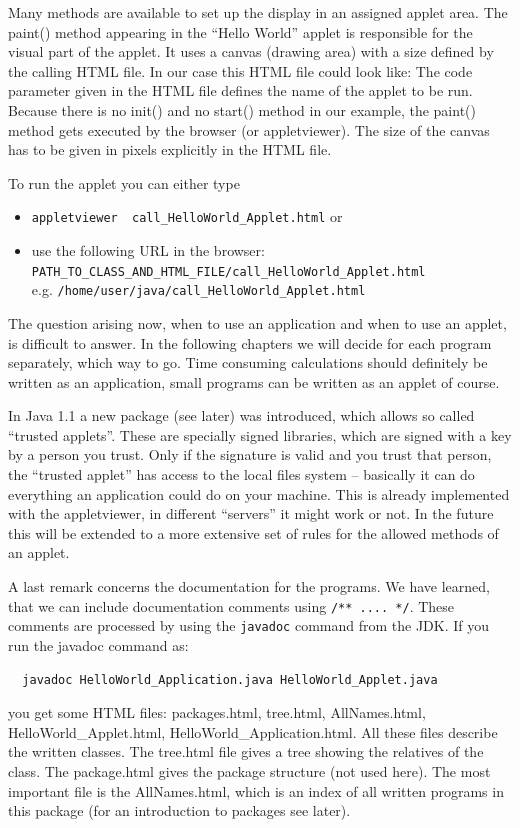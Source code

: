 Many methods are available to set up the display in an assigned applet area.
The paint() method appearing in the ``Hello World'' applet is
responsible for the visual part of the applet. It uses a canvas
(drawing area) with a size defined by the calling HTML file. In our case
this HTML file could look like:
The code parameter given in the HTML file defines the name of the applet
to be run. Because there is no init() and no start() method in our
example, the paint() method gets executed by the browser (or appletviewer).
The size of the canvas has to be given in pixels explicitly in the
HTML file.

To run the applet you can either type
\begin{itemize}
\item \verb|appletviewer  call_HelloWorld_Applet.html| or
\item use the following URL in the browser: \\
        \verb|PATH_TO_CLASS_AND_HTML_FILE/call_HelloWorld_Applet.html| \\
        e.g. \verb|/home/user/java/call_HelloWorld_Applet.html|
\end{itemize}

The question arising now, when to use an application and when to use
an applet, is difficult to answer. In the following chapters we will 
decide for each program
separately, which way to go. Time consuming calculations should
definitely be written as an application, small programs can be
written as an applet of course.

In Java 1.1 a new package (see later) was introduced, which allows
so called ``trusted applets''. These are specially signed libraries,
which are signed with a key by a person you trust. Only if the
signature is valid and you trust that person, the ``trusted applet''
has access to the local files system -- basically it can do everything
an application could do on your machine. This is already implemented with
the appletviewer, in different ``servers'' it might work or not. In the
future this will be extended to a more extensive set of rules for the
allowed methods of an applet.

A last remark concerns the documentation for the programs. We have
learned, that we can include documentation comments using 
\verb|/** .... */|. These comments are processed by using the
\verb|javadoc| command from the JDK. If you run the javadoc command as: 
\begin{verbatim}
  javadoc HelloWorld_Application.java HelloWorld_Applet.java  
\end{verbatim}
you get some HTML files: packages.html, tree.html, AllNames.html,
HelloWorld\_Applet.html, HelloWorld\_Application.html. All these
files describe the written classes. The tree.html file gives a tree
showing the relatives of the class. The package.html gives the
package structure (not used here). The most important file is the
AllNames.html, which is an index of all written programs in this package
(for an introduction to packages see later).

